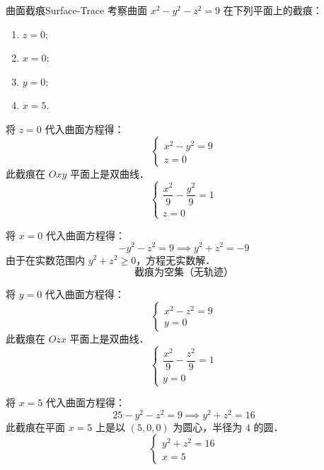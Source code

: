 \begin{problem}{曲面截痕}{Surface-Trace}
    考察曲面 $x^2 - y^2 - z^2 = 9$ 在下列平面上的截痕：
    \begin{enumerate}
        \item $z = 0$;
        \item $x = 0$;
        \item $y = 0$;
        \item $x = 5$.
    \end{enumerate}
\end{problem}

\begin{solution}
    将 $z = 0$ 代入曲面方程得：
    \begin{equation}
        \begin{cases}
            x^2 - y^2 = 9 \\
            z = 0
        \end{cases}
    \end{equation}
    此截痕在 $Oxy$ 平面上是双曲线．
    \begin{equation}
        \boxed{\begin{cases} \dfrac{x^2}{9} - \dfrac{y^2}{9} = 1 \\ z = 0 \end{cases}}
    \end{equation}

    将 $x = 0$ 代入曲面方程得：
    \begin{equation}
        -y^2 - z^2 = 9 \implies y^2 + z^2 = -9
    \end{equation}
    由于在实数范围内 $y^2 + z^2 \ge 0$，方程无实数解．
    \begin{equation}
        \boxed{\text{截痕为空集（无轨迹）}}
    \end{equation}

    将 $y = 0$ 代入曲面方程得：
    \begin{equation}
        \begin{cases}
            x^2 - z^2 = 9 \\
            y = 0
        \end{cases}
    \end{equation}
    此截痕在 $Ozx$ 平面上是双曲线．
    \begin{equation}
        \boxed{\begin{cases} \dfrac{x^2}{9} - \dfrac{z^2}{9} = 1 \\ y = 0 \end{cases}}
    \end{equation}

    将 $x = 5$ 代入曲面方程得：
    \begin{equation}
        25 - y^2 - z^2 = 9 \implies y^2 + z^2 = 16
    \end{equation}
    此截痕在平面 $x = 5$ 上是以 $(5, 0, 0)$ 为圆心，半径为 $4$ 的圆．
    \begin{equation}
        \boxed{\begin{cases} y^2 + z^2 = 16 \\ x = 5 \end{cases}}
    \end{equation}
\end{solution}


